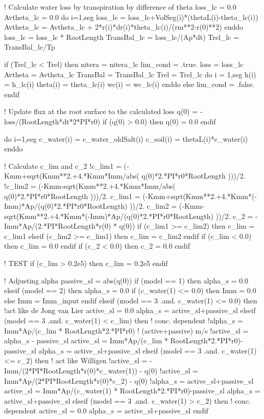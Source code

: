     ! Calculate water loss by transpiration by difference of theta
    loss_lc = 0.0
    Avtheta_lc = 0.0
    do i=1,seg
      loss_lc = loss_lc+VolSeg(i)*(thetaL(i)-theta_lc(i))
      Avtheta_lc = Avtheta_lc + 2*r(i)*dr(i)*theta_lc(i)/(rm**2-r(0)**2)
    enddo
    loss_lc = loss_lc * RootLength
    TransBal_lc = loss_lc/(Ap*dt)
    Trel_lc = TransBal_lc/Tp

    if (Trel_lc < Trel) then
      nitera = nitera_lc
      lim_cond = .true.
      loss = loss_lc
      Avtheta = Avtheta_lc
      TransBal = TransBal_lc
      Trel = Trel_lc
      do i = 1,seg
        h(i) = h_lc(i)
        theta(i) = theta_lc(i)
        wc(i) = wc_lc(i)
      enddo
    else
      lim_cond = .false.
    endif


    ! Update flux at the root surface to the calculated loss
    q(0) = -loss/(RootLength*dt*2*PI*r0)
    if (q(0) > 0.0) then
      q(0) = 0.0
    endif

        
    do i=1,seg
      c_water(i) = c_water_oldSalt(i)
      c_soil(i) = thetaL(i)*c_water(i)
    enddo

    ! Calculate c_lim and c_2
    !c_lim1 = (-Kmm+sqrt(Kmm**2.+4.*Kmm*Imm/abs( q(0)*2.*PI*r0*RootLength )))/2.
    !c_lim2 = (-Kmm-sqrt(Kmm**2.+4.*Kmm*Imm/abs( q(0)*2.*PI*r0*RootLength )))/2.
    c_lim1 = (-Kmm+sqrt(Kmm**2.+4.*Kmm*(-Imm)*Ap/(q(0)*2.*PI*r0*RootLength) ))/2.
    c_lim2 = (-Kmm-sqrt(Kmm**2.+4.*Kmm*(-Imm)*Ap/(q(0)*2.*PI*r0*RootLength) ))/2.
    c_2 = -Imm*Ap/(2.*PI*RootLength*r(0) * q(0))
    if (c_lim1 >= c_lim2) then
      c_lim = c_lim1
    elseif (c_lim2 >= c_lim1) then
      c_lim = c_lim2
    endif
    if (c_lim < 0.0) then
      c_lim = 0.0
    endif
    if (c_2 < 0.0) then
      c_2 = 0.0
    endif

    ! TEST
    if (c_lim > 0.2e5) then
      c_lim = 0.2e5
    endif

    ! Adjusting alpha
    passive_sl = abs(q(0))
    if (model == 1) then
      alpha_s = 0.0
    elseif (model == 2) then
      alpha_s = 0.0
      if (c_water(1) <= 0.0) then
        Imm = 0.0
      else
        Imm = Imm_input
      endif
    elseif (model == 3 .and. c_water(1) <= 0.0) then 	!act like de Jong van Lier
      active_sl = 0.0
      alpha_s = active_sl+passive_sl
    elseif (model == 3 .and. c_water(1) < c_lim) then	! conc. dependent
      !alpha_s = Imm*Ap/(c_lim * RootLength*2.*PI*r0)	! (active+passive) m/s
      !active_sl = alpha_s - passive_sl
      active_sl = Imm*Ap/(c_lim * RootLength*2.*PI*r0)-passive_sl
      alpha_s = active_sl+passive_sl
    elseif (model == 3 .and. c_water(1) <= c_2) then	! act like Willigen
      !active_sl = -Imm/(2*PI*RootLength*r(0)*c_water(1)) - q(0)
      !active_sl = Imm*Ap/(2*PI*RootLength*r(0)*c_2) - q(0)
      !alpha_s = active_sl+passive_sl
      active_sl = Imm*Ap/(c_water(1) * RootLength*2.*PI*r0)-passive_sl
      alpha_s = active_sl+passive_sl
    elseif (model == 3 .and. c_water(1) > c_2) then 	! conc. dependent
      active_sl = 0.0
      alpha_s = active_sl+passive_sl
    endif 

